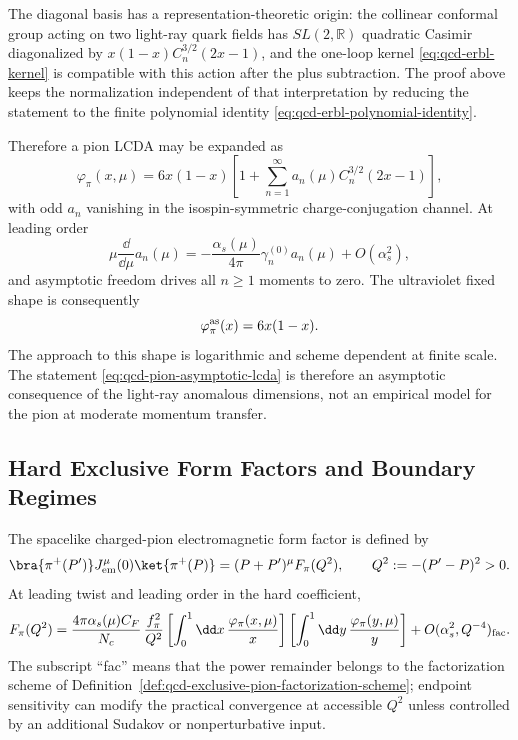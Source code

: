 The diagonal basis has a representation-theoretic origin: the collinear
conformal group acting on two light-ray quark fields has
\(SL(2,\mathbb R)\) quadratic Casimir diagonalized by
\(x(1-x)C_n^{3/2}(2x-1)\), and the one-loop kernel
\eqref{eq:qcd-erbl-kernel} is compatible with this action after the plus
subtraction.  The proof above keeps the normalization independent of that
interpretation by reducing the statement to the finite polynomial identity
\eqref{eq:qcd-erbl-polynomial-identity}.

Therefore a pion LCDA may be expanded as
\begin{equation}
  \varphi_\pi(x,\mu)
  =
  6x(1-x)
  \left[
  1+\sum_{n=1}^{\infty}a_n(\mu)C_n^{3/2}(2x-1)
  \right],
  \label{eq:qcd-pion-lcda-gegenbauer-expansion}
\end{equation}
with odd \(a_n\) vanishing in the isospin-symmetric charge-conjugation
channel.  At leading order
\begin{equation}
  \mu\frac{\dd}{\dd\mu}a_n(\mu)
  =
  -\frac{\alpha_s(\mu)}{4\pi}\gamma_n^{(0)}a_n(\mu)
  +O(\alpha_s^2),
  \label{eq:qcd-pion-gegenbauer-moment-rg}
\end{equation}
and asymptotic freedom drives all \(n\ge1\) moments to zero.  The ultraviolet
fixed shape is consequently
\begin{equation}
  \varphi_\pi^{\rm as}(x)=6x(1-x).
  \label{eq:qcd-pion-asymptotic-lcda}
\end{equation}
The approach to this shape is logarithmic and scheme dependent at finite
scale.  The statement \eqref{eq:qcd-pion-asymptotic-lcda} is therefore an
asymptotic consequence of the light-ray anomalous dimensions, not an empirical
model for the pion at moderate momentum transfer.

\subsection{Hard Exclusive Form Factors and Boundary Regimes}
\label{subsec:qcd-hard-exclusive-form-factors}

The spacelike charged-pion electromagnetic form factor is defined by
\begin{equation}
  \bra{\pi^+(P')}J^\mu_{\rm em}(0)\ket{\pi^+(P)}
  =
  (P+P')^\mu F_\pi(Q^2),
  \qquad
  Q^2:=-(P'-P)^2>0 .
  \label{eq:qcd-pion-em-form-factor-definition}
\end{equation}
At leading twist and leading order in the hard coefficient,
\begin{equation}
  F_\pi(Q^2)
  =
  \frac{4\pi\alpha_s(\mu)C_F}{N_c}\,
  \frac{f_\pi^2}{Q^2}
  \left[
  \int_0^1\dd x\,\frac{\varphi_\pi(x,\mu)}{x}
  \right]
  \left[
  \int_0^1\dd y\,\frac{\varphi_\pi(y,\mu)}{y}
  \right]
  +O(\alpha_s^2,Q^{-4})_{\rm fac}.
  \label{eq:qcd-pion-form-factor-factorization}
\end{equation}
The subscript ``fac'' means that the power remainder belongs to the
factorization scheme of Definition~\ref{def:qcd-exclusive-pion-factorization-scheme};
endpoint sensitivity can modify the practical convergence at accessible
\(Q^2\) unless controlled by an additional Sudakov or nonperturbative input.

